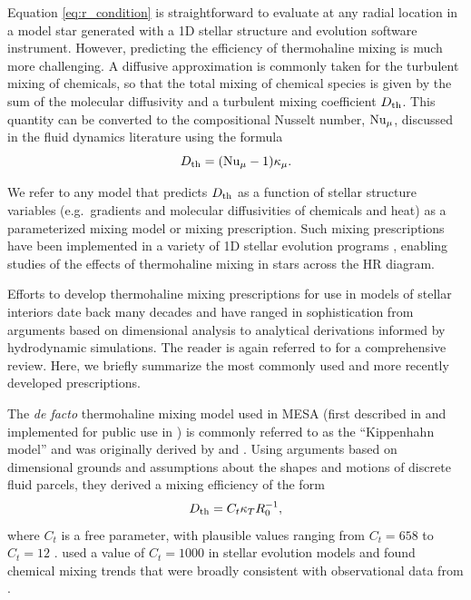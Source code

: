 %
Equation \eqref{eq:r_condition} is straightforward to evaluate at any radial location in a model star generated with a 1D stellar structure and evolution software instrument. 
However, predicting the efficiency of thermohaline mixing is much more challenging. 
A diffusive approximation is commonly taken for the turbulent mixing of chemicals, so that the total mixing of chemical species is given by the sum of the molecular diffusivity and a turbulent mixing coefficient $D_\mathrm{th}$. 
This quantity can be converted to the compositional Nusselt number, $\mathrm{Nu}_\mu$, discussed in the fluid dynamics literature using the formula
\begin{equation} \label{eq:Dth_from_Nu}
    \Dth = (\Numu - 1)\kappa_\mu.
\end{equation}

We refer to any model that predicts $D_\mathrm{th}$ as a function of stellar structure variables (e.g.~gradients and molecular diffusivities of chemicals and heat) as a parameterized mixing model or mixing prescription. 
Such mixing prescriptions have been implemented in a variety of 1D stellar evolution programs \citep[see][and references therein]{lattanzio_etal_2015}, enabling studies of the effects of thermohaline mixing in stars across the HR diagram.

Efforts to develop thermohaline mixing prescriptions for use in models of stellar interiors date back many decades and have ranged in sophistication from arguments based on dimensional analysis to analytical derivations informed by hydrodynamic simulations. 
The reader is again referred to \citet{garaud_DDC_review_2018} for a comprehensive review. Here, we briefly summarize the most commonly used and more recently developed prescriptions.


The \textit{de facto} thermohaline mixing model used in MESA (first described in \citealt{CantielloLanger2010} and implemented for public use in \citealt{mesa2}) is commonly referred to as the ``Kippenhahn model'' and was originally derived by \citet{ulrich_1972} and \citet{kippenhahn_etal_1980}.
Using arguments based on dimensional grounds and assumptions about the shapes and motions of discrete fluid parcels, they derived a mixing efficiency of the form
\begin{equation} \label{eq:Dth-kipp}
    \Dth = C_t \kappa_T R_0^{-1},
\end{equation}
\citep[see Eq.~(5) of][]{charbonnel_thermohaline_2007}
where $C_t$ is a free parameter, with plausible values ranging from $C_t = 658$ \citep{ulrich_1972} to $C_t = 12$ \citep{kippenhahn_etal_1980}. 
\citet{charbonnel_thermohaline_2007} used a value of $C_t = 1000$ in stellar evolution models and found chemical mixing trends that were broadly consistent with observational data from \citet{Gratton2000}.

